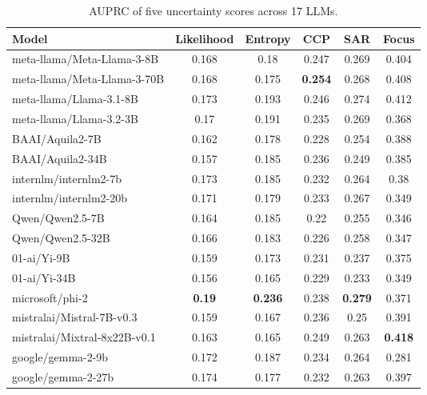 \begin{table*}[t]
    \centering
    \small 
    \begin{tabular}{lccccc}
        \toprule
        Model & Likelihood & Entropy & CCP & SAR & Focus \\
\midrule
meta-llama/Meta-Llama-3-8B & 0.168 & 0.18 & 0.247 & 0.269 & 0.404 \\
meta-llama/Meta-Llama-3-70B & 0.168 & 0.175 & \textbf{0.254} & 0.268 & 0.408 \\
meta-llama/Llama-3.1-8B & 0.173 & 0.193 & 0.246 & 0.274 & 0.412 \\
meta-llama/Llama-3.2-3B & 0.17 & 0.191 & 0.235 & 0.269 & 0.368 \\
BAAI/Aquila2-7B & 0.162 & 0.178 & 0.228 & 0.254 & 0.388 \\
BAAI/Aquila2-34B & 0.157 & 0.185 & 0.236 & 0.249 & 0.385 \\
internlm/internlm2-7b & 0.173 & 0.185 & 0.232 & 0.264 & 0.38 \\
internlm/internlm2-20b & 0.171 & 0.179 & 0.233 & 0.267 & 0.349 \\
Qwen/Qwen2.5-7B & 0.164 & 0.185 & 0.22 & 0.255 & 0.346 \\
Qwen/Qwen2.5-32B & 0.166 & 0.183 & 0.226 & 0.258 & 0.347 \\
01-ai/Yi-9B & 0.159 & 0.173 & 0.231 & 0.237 & 0.375 \\
01-ai/Yi-34B & 0.156 & 0.165 & 0.229 & 0.233 & 0.349 \\
microsoft/phi-2 & \textbf{0.19} & \textbf{0.236} & 0.238 & \textbf{0.279} & 0.371 \\
mistralai/Mistral-7B-v0.3 & 0.159 & 0.167 & 0.236 & 0.25 & 0.391 \\
mistralai/Mixtral-8x22B-v0.1 & 0.163 & 0.165 & 0.249 & 0.263 & \textbf{0.418} \\
google/gemma-2-9b & 0.172 & 0.187 & 0.234 & 0.264 & 0.281 \\
google/gemma-2-27b & 0.174 & 0.177 & 0.232 & 0.263 & 0.397 \\
        \bottomrule
    \end{tabular}
    \caption{
     AUPRC of five uncertainty scores across 17 LLMs.
    }
    \label{tb:auprc_17models}
\end{table*}